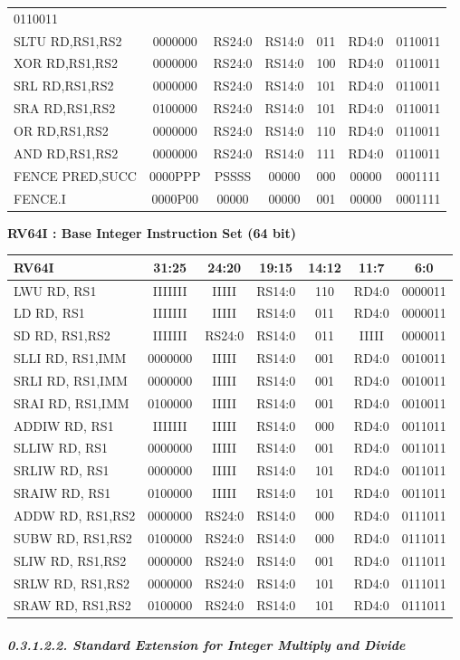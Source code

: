\documentclass[
]{article}
\begin{document}
\begin{longtable}[]{@{}lcccccc@{}}
0110011\tabularnewline
SLTU RD,RS1,RS2 & 0000000 & RS24:0 & RS14:0 & 011 & RD4:0 &
0110011\tabularnewline
XOR RD,RS1,RS2 & 0000000 & RS24:0 & RS14:0 & 100 & RD4:0 &
0110011\tabularnewline
SRL RD,RS1,RS2 & 0000000 & RS24:0 & RS14:0 & 101 & RD4:0 &
0110011\tabularnewline
SRA RD,RS1,RS2 & 0100000 & RS24:0 & RS14:0 & 101 & RD4:0 &
0110011\tabularnewline
OR RD,RS1,RS2 & 0000000 & RS24:0 & RS14:0 & 110 & RD4:0 &
0110011\tabularnewline
AND RD,RS1,RS2 & 0000000 & RS24:0 & RS14:0 & 111 & RD4:0 &
0110011\tabularnewline
FENCE PRED,SUCC & 0000PPP & PSSSS & 00000 & 000 & 00000 &
0001111\tabularnewline
FENCE.I & 0000P00 & 00000 & 00000 & 001 & 00000 & 0001111\tabularnewline
\bottomrule
\end{longtable}

\textbf{RV64I : Base Integer Instruction Set (64 bit)}

\begin{longtable}[]{@{}lcccccc@{}}
\toprule
RV64I & 31:25 & 24:20 & 19:15 & 14:12 & 11:7 & 6:0\tabularnewline
\midrule
\endhead
LWU RD, RS1 & IIIIIII & IIIII & RS14:0 & 110 & RD4:0 &
0000011\tabularnewline
LD RD, RS1 & IIIIIII & IIIII & RS14:0 & 011 & RD4:0 &
0000011\tabularnewline
SD RD, RS1,RS2 & IIIIIII & RS24:0 & RS14:0 & 011 & IIIII &
0000011\tabularnewline
SLLI RD, RS1,IMM & 0000000 & IIIII & RS14:0 & 001 & RD4:0 &
0010011\tabularnewline
SRLI RD, RS1,IMM & 0000000 & IIIII & RS14:0 & 001 & RD4:0 &
0010011\tabularnewline
SRAI RD, RS1,IMM & 0100000 & IIIII & RS14:0 & 001 & RD4:0 &
0010011\tabularnewline
ADDIW RD, RS1 & IIIIIII & IIIII & RS14:0 & 000 & RD4:0 &
0011011\tabularnewline
SLLIW RD, RS1 & 0000000 & IIIII & RS14:0 & 001 & RD4:0 &
0011011\tabularnewline
SRLIW RD, RS1 & 0000000 & IIIII & RS14:0 & 101 & RD4:0 &
0011011\tabularnewline
SRAIW RD, RS1 & 0100000 & IIIII & RS14:0 & 101 & RD4:0 &
0011011\tabularnewline
ADDW RD, RS1,RS2 & 0000000 & RS24:0 & RS14:0 & 000 & RD4:0 &
0111011\tabularnewline
SUBW RD, RS1,RS2 & 0100000 & RS24:0 & RS14:0 & 000 & RD4:0 &
0111011\tabularnewline
SLIW RD, RS1,RS2 & 0000000 & RS24:0 & RS14:0 & 001 & RD4:0 &
0111011\tabularnewline
SRLW RD, RS1,RS2 & 0000000 & RS24:0 & RS14:0 & 101 & RD4:0 &
0111011\tabularnewline
SRAW RD, RS1,RS2 & 0100000 & RS24:0 & RS14:0 & 101 & RD4:0 &
0111011\tabularnewline
\bottomrule
\end{longtable}

\hypertarget{standard-extension-for-integer-multiply-and-divide-1}{%
\subparagraph{0.3.1.2.2. Standard Extension for Integer Multiply and
Divide}\label{standard-extension-for-integer-multiply-and-divide-1}}
\end{document}
